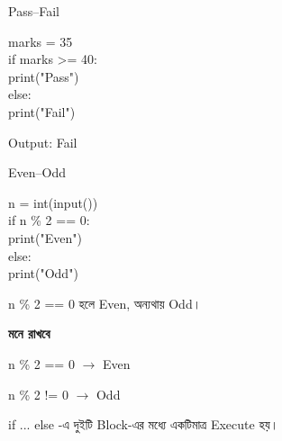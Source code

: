 \noindent
\begin{minipage}[t]{0.49\linewidth}

\begin{sideexamplebox}{Pass–Fail}

\begin{sidecodebox}
\begin{english}
\ttfamily
marks = 35\\
if marks >= 40:\\
\hspace*{4mm}print("Pass")\\
else:\\
\hspace*{4mm}print("Fail")
\end{english}
\end{sidecodebox}

Output:
\textenglish{\ttfamily Fail}

\end{sideexamplebox}

\end{minipage}
\hfill
\begin{minipage}[t]{0.49\linewidth}

\begin{sideexamplebox}{Even–Odd}

\begin{sidecodebox}
\begin{english}
\ttfamily
n = int(input())\\
if n \% 2 == 0:\\
\hspace*{4mm}print("Even")\\
else:\\
\hspace*{4mm}print("Odd")
\end{english}
\end{sidecodebox}

\textenglish{\ttfamily n \% 2 == 0}
হলে Even, অন্যথায় Odd।

\end{sideexamplebox}

\end{minipage}

\begin{rememberbox}

\textbf{\color{deepOrange}মনে রাখবে}

\begin{center}

\textenglish{\ttfamily n \% 2 == 0}
\(\longrightarrow\)
Even

\qquad

\textenglish{\ttfamily n \% 2 != 0}
\(\longrightarrow\)
Odd

\end{center}

\textenglish{\ttfamily if ... else}
-এ দুইটি Block-এর মধ্যে একটিমাত্র Execute হয়।

\end{rememberbox}

